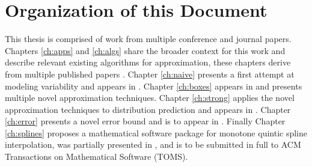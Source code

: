 \section{Organization of this Document}

This thesis is comprised of work from multiple conference and journal
papers. Chapters \ref{ch:apps} and \ref{ch:algs} share the broader
context for this work and describe relevant existing algorithms for
approximation, these chapters derive from multiple published papers
\cite{lux2018predictive,lux2020effective,lux2020interpolation}. Chapter
\ref{ch:naive} presents a first attempt at modeling variability and
appears in \cite{lux2018predictive}. Chapter \ref{ch:boxes} appears in
\cite{lux2018novel} and presents multiple novel approximation
techniques. Chapter \ref{ch:strong} applies the novel approximation
techniques to distribution prediction and appears in
\cite{lux2018nonparametric}. Chapter \ref{ch:error} presents a novel
error bound and is to appear in \cite{lux2020interpolation}. Finally
Chapter \ref{ch:splines} proposes a mathematical software package for
monotone quintic spline interpolation, was partially presented in
\cite{lux2020algorithm}, and is to be submitted in full to ACM
Transactions on Mathematical Software (TOMS).
